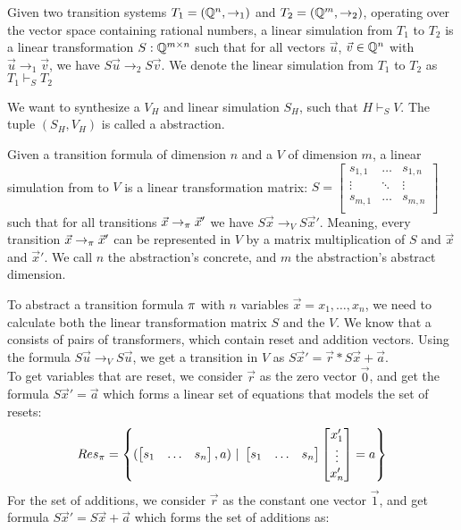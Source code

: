 \begin{mydef}
	Given two transition systems $T_1 = ( \mathbb{Q} ^n, \rightarrow_1)$ and $T_2 = ( \mathbb{Q} ^m, \rightarrow_2)$, operating over the vector space containing rational numbers, a linear simulation from $T_1$ to $T_2$ is a linear transformation $S:  \mathbb{Q} ^{m \times n}$ such that for all vectors $\vec{u}$, $\vec{v} \in  \mathbb{Q} ^n$ with $\vec{u} \rightarrow_1 \vec{v}$, we have $S\vec{u} \rightarrow_2 S\vec{v}$. We denote the linear simulation from $T_1$ to $T_2$ as $T_1 \vdash_S T_2$
\end{mydef}
We want to synthesize a \qvasr $V_H$ and linear simulation $S_H$, such that $H \vdash_S V$. The tuple $(S_H, V_H)$ is called a \qvasr abstraction.
\begin{mydef}
	Given a transition formula \trf of dimension $n$ and a \qvasr $V$ of dimension $m$, a linear simulation from \trf to $V$ is a linear transformation matrix: 
	$S = 
	\begin{bmatrix}
		s_{1 ,1} & \ldots & s_{1, n} \\
		\vdots & \ddots & \vdots \\
		s_{m ,1} & \ldots & s_{m, n} \\
	\end{bmatrix}$ 
	such that for all transitions $\vec{x} \rightarrow_\pi \vec{x}'$ we have $S\vec{x} \rightarrow_V S\vec{x}'$. Meaning, every transition $\vec{x} \rightarrow_\pi \vec{x}'$ can be represented in $V$ by a matrix multiplication of $S$ and $\vec{x}$ and $\vec{x}'$. We call $n$ the abstraction's concrete, and $m$ the abstraction's abstract dimension. 
\end{mydef}
To abstract a transition formula $\pi$ with $n$ variables $\vec{x} = x_1, \ldots, x_n$, we need to calculate both the linear transformation matrix $S$ and the \qvasr $V$. We know that a \qvasr consists of pairs of transformers, which contain reset and addition vectors. Using the formula $S \vec{u} \rightarrow_V S\vec{u}$, we get a transition in $V$ as $S\vec{x}' = \vec{r}*S\vec{x} + \vec{a}$. \\ To get variables that are reset, we consider $\vec{r}$ as the zero vector $\vec{0}$, and get the formula $S\vec{x}' = \vec{a}$ which forms a linear set of equations that models the set of resets:
\begin{equation*}
	Res_\pi = \left\{ (\begin{bmatrix} s_1 & \ldots &s_n \end{bmatrix}, a)\ |\ \begin{bmatrix} s_1 & \ldots &s_n \end{bmatrix} \begin{bmatrix} x_1' \\ \vdots \\ x_n' \end{bmatrix} = a \right\}	
\end{equation*}
For the set of additions, we consider $\vec{r}$ as the constant one vector $\vec{1}$, and get formula $S\vec{x}' = S\vec{x} + \vec{a}$ which forms the set of additions as:
